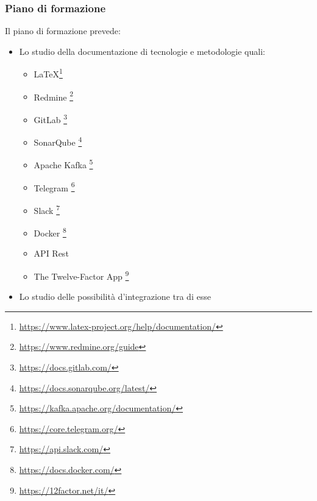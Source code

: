 		\subsubsection{Piano di formazione}
		Il piano di formazione prevede:
		\begin{itemize}
			\item Lo studio della documentazione di tecnologie e metodologie quali:
			\begin{itemize}
				\item \LaTeX \footnote{\url{https://www.latex-project.org/help/documentation/}}
				\item Redmine \footnote{\url{https://www.redmine.org/guide}}
				\item GitLab \footnote{\url{https://docs.gitlab.com/}}
				\item SonarQube \footnote{\url{https://docs.sonarqube.org/latest/}}
				\item Apache Kafka \footnote{\url{https://kafka.apache.org/documentation/}}
				\item Telegram \footnote{\url{https://core.telegram.org/}}
				\item Slack \footnote{\url{https://api.slack.com/}}
				\item Docker \footnote{\url{https://docs.docker.com/}}
				\item API Rest
				\item The Twelve-Factor App \footnote{\url{https://12factor.net/it/}}
			\end{itemize}
			\item Lo studio delle possibilità d'integrazione tra di esse
		\end{itemize}
